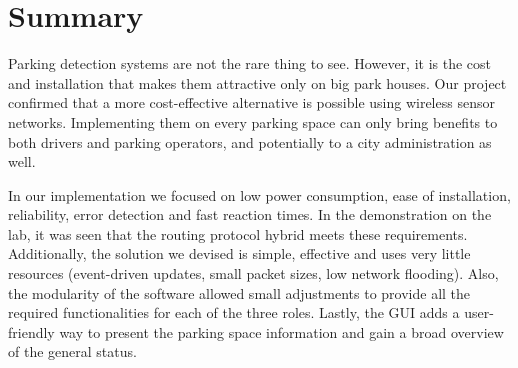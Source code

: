 ﻿\chapter{Summary}
\label{chap:summary}

Parking detection systems are not the rare thing to see. 
However, it is the cost and installation that makes them attractive only on big park houses.
Our project confirmed that a more cost-effective alternative is possible using wireless sensor networks.
Implementing them on every parking space can only bring benefits to both drivers and parking operators, and potentially to a city administration as well.

In our implementation we focused on low power consumption, ease of installation, reliability, error detection and fast reaction times.
In the demonstration on the lab, it was seen that the routing protocol hybrid meets these requirements.
Additionally, the solution we devised is simple, effective and uses very little resources (event-driven updates, small packet sizes, low network flooding).
Also, the modularity of the software allowed small adjustments to provide all the required functionalities for each of the three roles.
Lastly, the GUI adds a user-friendly way to present the parking space information and gain a broad overview of the general status.
